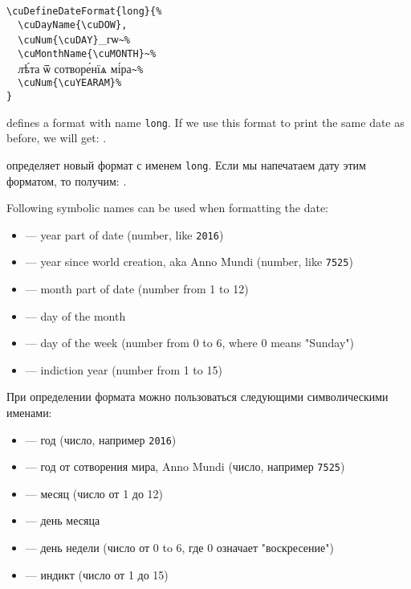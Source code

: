 \begin{churchslavonic}
\noindent
\verb+\cuDefineDateFormat{long}{%+\\
\verb+  \cuDayName{\cuDOW},+\\
\verb+  \cuNum{\cuDAY}+_гѡ\verb+~%+\\
\verb+  \cuMonthName{\cuMONTH}~%+\\
\verb+  +лѣ́та ѿ сотворе́нїѧ мі́ра\verb+~%+\\
\verb+  \cuNum{\cuYEARAM}%+\\
\verb+}+\\
\end{churchslavonic}
%
%
\begin{EN}
defines a format with name \texttt{long}. If we use this format to print the same date as before, we will get:
.
\end{EN}

\begin{RU}
определяет новый формат с именем \texttt{long}. Если мы напечатаем дату этим форматом, то получим:
.
\end{RU}

\begin{EN}
Following symbolic names can be used when formatting the date:
\begin{itemize}
\item {} --- year part of date (number, like \texttt{2016})
\item {} --- year since world creation, aka Anno Mundi (number, like \texttt{7525})
\item {} --- month part of date (number from 1 to 12)
\item {} --- day of the month
\item {} --- day of the week (number from 0 to 6, where 0 means "Sunday")
\item {} --- indiction year (number from 1 to 15)
\end{itemize}
\end{EN}

\begin{RU}
При определении формата можно пользоваться следующими символическими именами:
\begin{itemize}
\item {} --- год (число, например \texttt{2016})
\item {} --- год от сотворения мира, Anno Mundi (число, например \texttt{7525})
\item {} --- месяц (число от 1 до 12)
\item {} --- день месяца
\item {} --- день недели (число от 0 to 6, где 0 означает "воскресение")
\item {} --- индикт (число от 1 до 15)
\end{itemize}
\end{RU}

